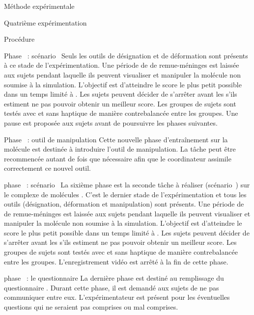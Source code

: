 \documentclass[myfrancais]{mythesis}
\begin{document}
\begin{mychapter}{Méthode expérimentale}
\begin{mysection}{Quatrième expérimentation}
\begin{mysubsection}{Procédure}
\begin{myparagraph}{Phase~ : scénario~}
					Seuls les outils de désignation et de déformation sont présents à ce stade de l'expérimentation.
					Une période de  de remue-méninges est laissée aux sujets pendant laquelle ils peuvent visualiser et manipuler la molécule non soumise à la simulation.
					L'objectif est d'atteindre le score  le plus petit possible dans un temps limité à .
					Les sujets peuvent décider de s'arrêter avant les  s'ils estiment ne pas pouvoir obtenir un meilleur score.
					Les groupes de sujets sont testés avec et sans haptique de manière contrebalancée entre les groupes.
					Une pause est proposée aux sujets avant de poursuivre les phases suivantes.
				\end{myparagraph}
				\begin{myparagraph}{Phase~ : outil de manipulation}
					Cette nouvelle phase d'entraînement sur la molécule \myTRPZIPPER est destinée à introduire l'outil de manipulation.
					La tâche peut être recommencée autant de fois que nécessaire afin que le coordinateur assimile correctement ce nouvel outil.
				\end{myparagraph}
				\begin{myparagraph}{phase~ : scénario~}
					La sixième phase est la seconde tâche à réaliser (scénario~) sur le complexe de molécules \myNusENusG.
					C'est le dernier stade de l'expérimentation et tous les outils (désignation, déformation et manipulation) sont présents.
					Une période de  de remue-méninges est laissée aux sujets pendant laquelle ils peuvent visualiser et manipuler la molécule non soumise à la simulation.
					L'objectif est d'atteindre le score  le plus petit possible dans un temps limité à .
					Les sujets peuvent décider de s'arrêter avant les  s'ils estiment ne pas pouvoir obtenir un meilleur score.
					Les groupes de sujets sont testés avec et sans haptique de manière contrebalancée entre les groupes.
					L'enregistrement vidéo est arrêté à la fin de cette phase.
				\end{myparagraph}
				\begin{myparagraph}{phase~ : le questionnaire}
					La dernière phase est destiné au remplissage du questionnaire .
					Durant cette phase, il est demandé aux sujets de ne pas communiquer entre eux.
					L'expérimentateur est présent pour les éventuelles questions qui ne seraient pas comprises ou mal comprises.
				\end{myparagraph}
			\end{mysubsection}
		\end{mysection}
	\end{mychapter}
\end{document}
